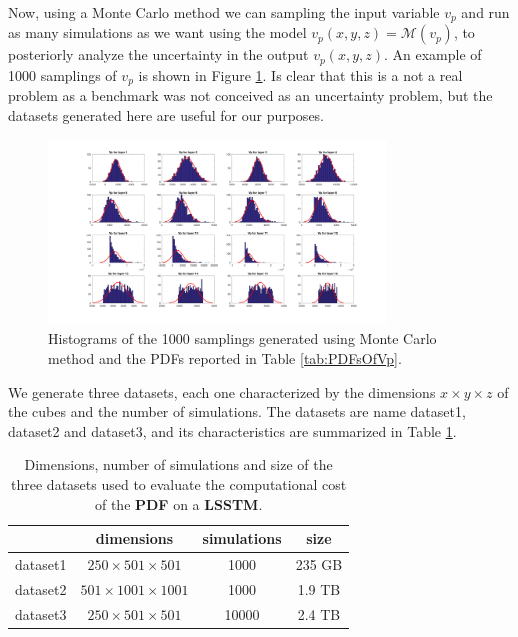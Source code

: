 Now, using a Monte Carlo method we can sampling the input variable $v_{p}$ and run as many simulations as we want using the model $v_{p}(x,y,z) = \mathcal{M}(v_{p})$, to posteriorly analyze the uncertainty in the output $v_{p}(x,y,z)$. An example of 1000 samplings of $v_{p}$ is shown in Figure \ref{fig:vp_1000_realizations}. Is clear that this is a not a real problem as a benchmark was not conceived as an uncertainty problem, but the datasets generated here are useful for our purposes.

\begin{figure}[ht]
    \centering
    \includegraphics[width=0.8\textwidth]{images/vp_1000_realizations.png}
    \caption{Histograms of the 1000 samplings generated using Monte Carlo method and the PDFs reported in Table \ref{tab:PDFsOfVp}.}
    \label{fig:vp_1000_realizations}
\end{figure}

We generate three datasets, each one characterized by the dimensions $x \times y \times z$ of the cubes and the number of simulations. The datasets are name dataset1, dataset2 and dataset3, and its characteristics are summarized in Table \ref{tab:datasets}.

\begin{table}[H]
\centering
\begin{tabular}{c|c|c|c|}
\cline{2-4}
                               & dimensions                & simulations & size   \\ \hline
\multicolumn{1}{|c|}{dataset1} & $250\times501\times501$   & 1000        & 235 GB \\ \hline
\multicolumn{1}{|c|}{dataset2} & $501\times1001\times1001$ & 1000        & 1.9 TB \\ \hline
\multicolumn{1}{|c|}{dataset3} & $250\times501\times501$   & 10000       & 2.4 TB \\ \hline
\end{tabular}
\caption{Dimensions, number of simulations and size of the three datasets used to evaluate the computational cost of the \textbf{PDF} on a \textbf{LSSTM}.}
\label{tab:datasets}
\end{table}


